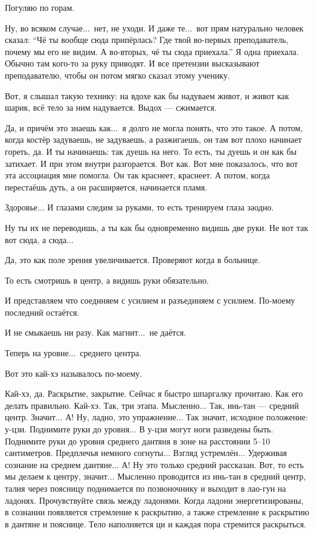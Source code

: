 \I
Погуляю по горам.

\M
Ну, во всяком случае...\ нет, не уходи. И даже те...\ вот прям натурально человек
сказал: ``Чё ты вообще сюда припёрлась? Где твой во-первых преподаватель,
почему мы его не видим. А во-вторых, чё ты сюда приехала.''
Я одна приехала.
Обычно там кого-то за руку приводят. И все претензии высказывают преподавателю,
чтобы он потом мягко сказал этому ученику.

\I
Вот, я слышал такую технику: на вдохе как бы надуваем живот, и живот как шарик,
всё тело за ним надувается. Выдох --- сжимается.

\M
Да, и причём это знаешь как...\ я долго не могла понять, что это такое. А
потом, когда костёр задуваешь, не задуваешь, а разжигаешь, он там вот плохо начинает гореть, да.
И ты начинаешь: так дуешь на него.
То есть, ты дуешь и он как бы затихает.
И при этом внутри разгорается. Вот как. Вот мне показалось, что вот эта ассоциация мне помогла.
Он так краснеет, краснеет.
А потом, когда перестаёшь дуть, а он расширяется, начинается пламя.

\I
Здоровье...
И глазами следим за руками, то есть тренируем глаза заодно.

\M
Ну ты их не переводишь, а ты как бы одновременно видишь две руки. Не вот так вот сюда,
а сюда...

\I
Да, это как поле зрения увеличивается.
Проверяют когда в больнице.

\M
То есть
смотришь в центр, а видишь руки обязательно.

\I
И представляем что соединяем с усилием и разъединяем с усилием.
По-моему последний остаётся.

\M
И не смыкаешь ни разу. Как магнит...\ не даётся.

\I
Теперь на уровне...\ среднего центра.

\M
Вот это кай-хэ называлось по-моему.

\I
Кай-хэ, да.
Раскрытие, закрытие. Сейчас я быстро шпаргалку прочитаю. Как
его делать правильно. Кай-хэ. Так, три этапа.
Мысленно... Так, инь-тан --- средний центр. Значит...
А! Ну, ладно, это упражнение... Так значит, исходное положение: у-цзи.
Поднимите руки до уровня... В у-цзи могут ноги разведены быть. Поднимите
руки до уровня среднего дантяня в зоне на расстоянии 5--10
сантиметров. Предплечья немного согнуты... Взгляд устремлён...
Удерживая сознание на среднем дантяне... А! Ну это только средний рассказан. Вот,
то есть мы делаем к центру, значит... Мысленно проводится из инь-тан в средний центр,
талия через поясницу поднимается по позвоночнику и выходит в лао-гун на ладонях.
Прочувствуйте связь между ладонями. Когда ладони энергетизированы, в сознании появляется
стремление к раскрытию, а также стремление к раскрытию в дантяне и пояснице.
Тело наполняется ци и каждая пора стремится раскрыться.

